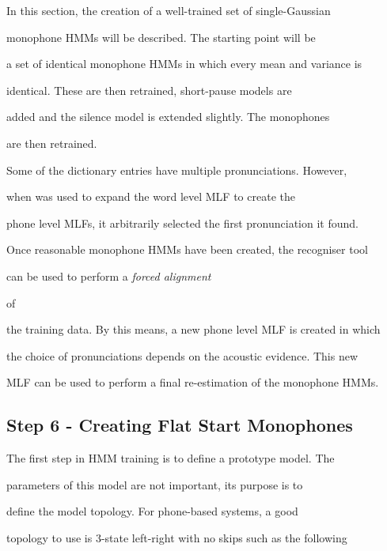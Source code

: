 In this section, the creation of a well-trained set of single-Gaussian


monophone HMMs will be described.  The starting point will be


a set of identical monophone HMMs in which every mean and variance is


identical.  These are then retrained, short-pause models are


added and the silence model is extended slightly.  The monophones


are then retrained.





Some of the dictionary entries have multiple pronunciations.  However,


when  was used to expand the word level MLF to create the


phone level MLFs, it arbitrarily selected the first pronunciation it found.


Once reasonable monophone HMMs have been created, the recogniser tool


 can be used to perform a \textit{forced alignment} 


of


the training data.  By this means, a new phone level MLF is created in which


the choice of pronunciations depends on the acoustic evidence.  This new


MLF can be used to perform a final re-estimation of the monophone HMMs.







\subsection{Step 6 - Creating Flat Start Monophones}





The first step in HMM training is to define a prototype model.  The


parameters of this model are not important, its purpose is to


define the model topology.  For phone-based systems,  a good


topology to use is 3-state left-right with no skips such as the following


